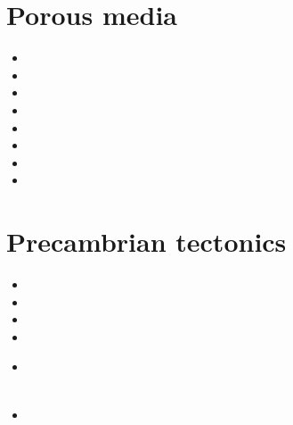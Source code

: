 \section{Porous media} 

\begin{small}
\begin{itemize}
\item[\nineteeneightysix] 
\item[\nineteeneightyeight] 
\item[\nineteenninetythree] 
\item[\nineteenninetynine] 
\item[\twothousand] 
\item[\twothousandthirteen] 
\item[\twothousandnineteen] 
\item[\twothousandtwenty] 
\end{itemize}
\end{small}

\section{Precambrian tectonics}

\begin{small}
\begin{itemize}
\item[\nineteenninetyfour] 
\item[\twothousandthree] 
\item[\twothousandten] 
\item[\twothousandeleven] 
\item[\twothousandfourteen] 
 \\
 \\
\item[\twothousandtwenty] 
\end{itemize}
\end{small}

